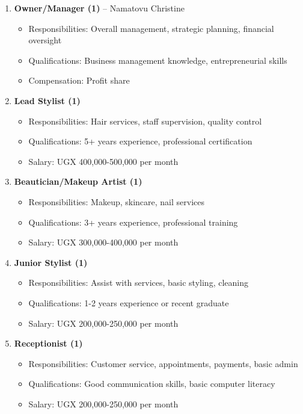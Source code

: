 \begin{enumerate}[leftmargin=2em]
    \item \textbf{Owner/Manager (1)} -- Namatovu Christine
    \begin{itemize}
        \item Responsibilities: Overall management, strategic planning, financial oversight
        \item Qualifications: Business management knowledge, entrepreneurial skills
        \item Compensation: Profit share
    \end{itemize}
    
    \item \textbf{Lead Stylist (1)}
    \begin{itemize}
        \item Responsibilities: Hair services, staff supervision, quality control
        \item Qualifications: 5+ years experience, professional certification
        \item Salary: UGX 400,000-500,000 per month
    \end{itemize}
    
    \item \textbf{Beautician/Makeup Artist (1)}
    \begin{itemize}
        \item Responsibilities: Makeup, skincare, nail services
        \item Qualifications: 3+ years experience, professional training
        \item Salary: UGX 300,000-400,000 per month
    \end{itemize}
    
    \item \textbf{Junior Stylist (1)}
    \begin{itemize}
        \item Responsibilities: Assist with services, basic styling, cleaning
        \item Qualifications: 1-2 years experience or recent graduate
        \item Salary: UGX 200,000-250,000 per month
    \end{itemize}
    
    \item \textbf{Receptionist (1)}
    \begin{itemize}
        \item Responsibilities: Customer service, appointments, payments, basic admin
        \item Qualifications: Good communication skills, basic computer literacy
        \item Salary: UGX 200,000-250,000 per month
    \end{itemize}
\end{enumerate}

